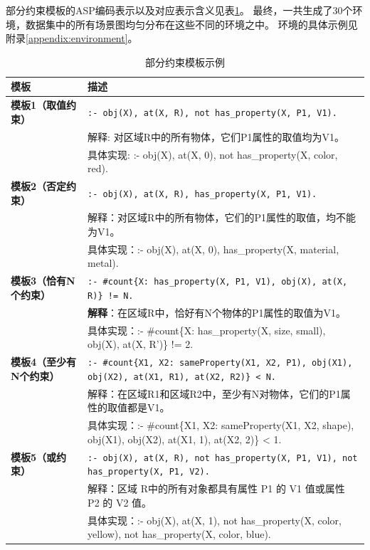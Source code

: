 部分约束模板的ASP编码表示以及对应表示含义见表\ref{tab:asp_templates}。
最终，一共生成了30个环境，数据集中的所有场景图均匀分布在这些不同的环境之中。
环境的具体示例见附录\ref{appendix:environment}。
\begin{table}[h]
    \centering
    \renewcommand{\arraystretch}{1.0}
    \begin{tabular}{|p{3cm}|p{12cm}|}
        \hline
        \textbf{模板} & \textbf{描述} \\
        \hline
        \textbf{模板1（取值约束）} & 
        \texttt{:- obj(X), at(X, R), not has\_property(X, P1, V1).} \\ 
        & 解释: 对区域R中的所有物体，它们P1属性的取值均为V1。 \\ 
        & 具体实现: :- obj(X), at(X, 0), not has\_property(X, color, red). \\
        \hline
        
        \textbf{模板2（否定约束）} & 
        \texttt{:- obj(X), at(X, R), has\_property(X, P1, V1).} \\ 
        & 解释：对区域R中的所有物体，它们的P1属性的取值，均不能为V1。 \\ 
        & 具体实现：:- obj(X), at(X, 0), has\_property(X, material, metal). \\
        \hline
        
        \textbf{模板3（恰有N个约束）} & 
        \texttt{:- \#count\{X: has\_property(X, P1, V1), obj(X), at(X, R)\} != N.} \\ 
        & \textbf{解释}：在区域R中，恰好有N个物体的P1属性的取值为V1。 \\ 
        & 具体实现：:- \#count\{X: has\_property(X, size, small), obj(X), at(X, R')\} != 2. \\
        \hline
        
        \textbf{模板4（至少有N个约束）} & 
        \texttt{:- \#count\{X1, X2: sameProperty(X1, X2, P1), obj(X1), obj(X2), at(X1, R1), at(X2, R2)\} < N.} \\ 
        & 解释：在区域R1和区域R2中，至少有N对物体，它们的P1属性的取值都是V1。 \\ 
        & 具体实现：:- \#count\{X1, X2: sameProperty(X1, X2, shape), obj(X1), obj(X2), at(X1, 1), at(X2, 2)\} < 1. \\
        \hline
        
        \textbf{模板5（或约束）} & 
        \texttt{:- obj(X), at(X, R), not has\_property(X, P1, V1), not has\_property(X, P1, V2).} \\ 
        & 解释：区域 R中的所有对象都具有属性 P1 的 V1 值或属性 P2 的 V2 值。 \\ 
        & 具体实现：:- obj(X), at(X, 1), not has\_property(X, color, yellow), not has\_property(X, color, blue). \\
        \hline
    \end{tabular}
    \caption{部分约束模板示例}
    \label{tab:asp_templates}
\end{table}
